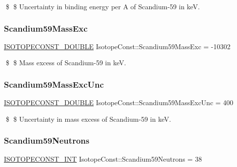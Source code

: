 \$ \$ Uncertainty in binding energy per A of Scandium-\/59 in keV. \mbox{\label{group___isotope_const-_scandium-_sc59_gac531b2f75a519410eb3748ffc054d887}} 
\subsubsection{\texorpdfstring{Scandium59\+Mass\+Exc}{Scandium59MassExc}}
{\footnotesize\ttfamily \mbox{\hyperlink{group___isotope_const-_macros_ga8f45a7272ce02c0b4c65c44636ed719a}{I\+S\+O\+T\+O\+P\+E\+C\+O\+N\+S\+T\+\_\+\+D\+O\+U\+B\+LE}} Isotope\+Const\+::\+Scandium59\+Mass\+Exc = -\/10302}

\$ \$ Mass excess of Scandium-\/59 in keV. \mbox{\label{group___isotope_const-_scandium-_sc59_gaff306b90bdf97f9931a2670e1765be34}} 
\subsubsection{\texorpdfstring{Scandium59\+Mass\+Exc\+Unc}{Scandium59MassExcUnc}}
{\footnotesize\ttfamily \mbox{\hyperlink{group___isotope_const-_macros_ga8f45a7272ce02c0b4c65c44636ed719a}{I\+S\+O\+T\+O\+P\+E\+C\+O\+N\+S\+T\+\_\+\+D\+O\+U\+B\+LE}} Isotope\+Const\+::\+Scandium59\+Mass\+Exc\+Unc = 400}

\$ \$ Uncertainty in mass excess of Scandium-\/59 in keV. \mbox{\label{group___isotope_const-_scandium-_sc59_gac854270f99a4a39271aded26731b6070}} 
\subsubsection{\texorpdfstring{Scandium59\+Neutrons}{Scandium59Neutrons}}
{\footnotesize\ttfamily \mbox{\hyperlink{group___isotope_const-_macros_ga5f18360b3e99483a35c32d789e62621c}{I\+S\+O\+T\+O\+P\+E\+C\+O\+N\+S\+T\+\_\+\+I\+NT}} Isotope\+Const\+::\+Scandium59\+Neutrons = 38}

